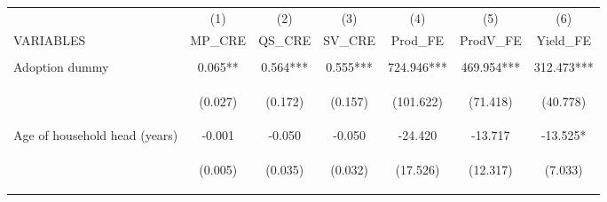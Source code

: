 \begin{center}
\begin{tabular}{lcccccc} \hline
 & (1) & (2) & (3) & (4) & (5) & (6) \\
VARIABLES & MP\_CRE & QS\_CRE & SV\_CRE & Prod\_FE & ProdV\_FE & Yield\_FE \\ \hline
\vspace{4pt} & \begin{footnotesize}\end{footnotesize} & \begin{footnotesize}\end{footnotesize} & \begin{footnotesize}\end{footnotesize} & \begin{footnotesize}\end{footnotesize} & \begin{footnotesize}\end{footnotesize} & \begin{footnotesize}\end{footnotesize} \\
Adoption dummy & 0.065** & 0.564*** & 0.555*** & 724.946*** & 469.954*** & 312.473*** \\
\vspace{4pt} & \begin{footnotesize}(0.027)\end{footnotesize} & \begin{footnotesize}(0.172)\end{footnotesize} & \begin{footnotesize}(0.157)\end{footnotesize} & \begin{footnotesize}(101.622)\end{footnotesize} & \begin{footnotesize}(71.418)\end{footnotesize} & \begin{footnotesize}(40.778)\end{footnotesize} \\
Age of household head (years) & -0.001 & -0.050 & -0.050 & -24.420 & -13.717 & -13.525* \\
\vspace{4pt} & \begin{footnotesize}(0.005)\end{footnotesize} & \begin{footnotesize}(0.035)\end{footnotesize} & \begin{footnotesize}(0.032)\end{footnotesize} & \begin{footnotesize}(17.526)\end{footnotesize} & \begin{footnotesize}(12.317)\end{footnotesize} & \begin{footnotesize}(7.033)\end{footnotesize} \\

\end{tabular}
\end{center}

